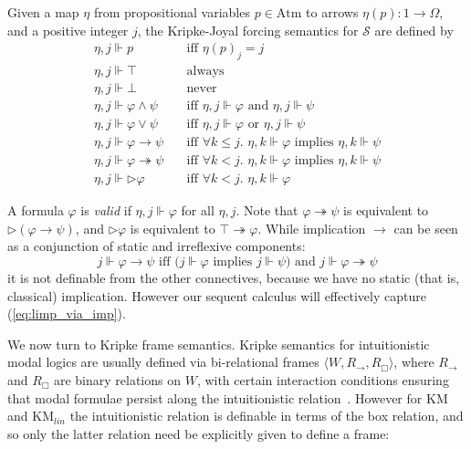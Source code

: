 \documentclass[envcountsect,envcountsame]{llncs}
\newcommand{\atms}{\mathrm{Atm}}
\newcommand{\eqref}[1]{(\ref{#1})}
\newcommand{\forces}{\Vdash}
\newcommand{\iimp}{\twoheadrightarrow}
\newcommand{\lcnxt}{\mathrm{KM}_{lin}}
\newcommand{\lgkm}{\mathrm{KM}}
\newcommand{\limp}{\rightarrow}
\newcommand{\nxt}{\rhd}
\newcommand{\later}{\nxt}
\newcommand{\trees}{\mathcal{S}}
\newcommand{\wbx}{\Box}
\begin{document}
Given a map $\eta$ from propositional variables $p\in\atms$ to arrows $\eta(p):1\to\Omega$, and a positive integer $j$, the
Kripke-Joyal forcing semantics for $\trees$ are defined by
\[\begin{array}{ll}
  \eta,j\forces p &\mbox{iff $\eta(p)_j=j$} \\
  \eta,j\forces \top & \mbox{always} \\
  \eta,j\forces \bot & \mbox{never} \\
  \eta,j\forces \varphi\land\psi \quad &
    \mbox{iff }\eta,j\forces\varphi\mbox{ and }\eta,j\forces\psi \\
  \eta,j\forces \varphi\lor\psi \quad &
    \mbox{iff }\eta,j\forces\varphi\mbox{ or }\eta,j\forces\psi \\
  \eta,j\forces \varphi\limp\psi \quad &
    \mbox{iff $\forall k\leq j$. }
    \eta,k\forces\varphi\mbox{ implies }\eta,k\forces\psi \\
  \eta,j\forces \varphi\iimp\psi \quad &
    \mbox{iff $\forall k< j$. }
    \eta,k\forces\varphi\mbox{ implies }\eta,k\forces\psi \\
  \eta,j\forces \later\varphi &
    \mbox{iff $\forall k< j$. }
    \eta,k\forces\varphi
\end{array}\]

A formula $\varphi$ is \emph{valid} if $\eta,j\forces\varphi$ for all $\eta,j$.
Note that $\varphi\iimp\psi$ is equivalent to $\later(\varphi\limp\psi)$, and $\later\varphi$ is equivalent to $\top\iimp\varphi$.
While implication $\limp$ can be seen as a conjunction of static and irreflexive components:
\begin{equation}\label{eq:limp_via_imp}
    j\forces\varphi\limp\psi
      \mbox{ \ iff \ ($j\forces\varphi$ implies $j\forces\psi$) and $j\forces\varphi\iimp\psi$}
\end{equation}
it is not definable from the other connectives, because we have no static (that is,
classical) implication. However our sequent calculus will effectively capture
\eqref{eq:limp_via_imp}.

We now turn to Kripke frame semantics. Kripke semantics for intuitionistic modal
logics are usually defined via bi-relational frames $\langle W, R_\limp,
R_\wbx \rangle$, where $R_\limp$ and $R_\wbx$ are binary relations on $W$, with
certain interaction conditions ensuring that modal formulae persist along the
intuitionistic relation~\cite{wolter-zakharyaschev-iml}. However for $\lgkm$ and $\lcnxt$ the intuitionistic relation is definable in terms of the box relation, and so only
the latter relation need be explicitly given to define a frame:
\end{document}
